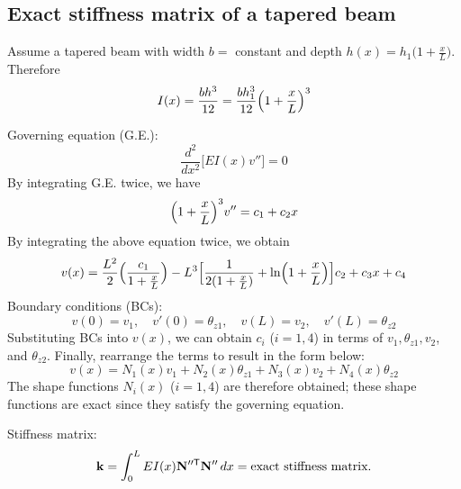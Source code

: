 \subsection{Exact stiffness matrix of a tapered beam}
\begin{minipage}{0.45\linewidth}
Assume a tapered beam with width $b =$ constant and depth $h(x) = h_1\bigl(1+\frac xL\bigr)$. Therefore
\begin{equation*}
  I(x) = \frac{bh^3}{12} = \frac{bh_1^3}{12}\Bigl(1+\frac xL\Bigr)^3
\end{equation*}
\end{minipage}\hfill
\begin{minipage}{0.5\linewidth}\centering
  
\end{minipage}

Governing equation (G.E.):
\begin{equation}
  \frac{d^2}{dx^2}\bigl[EI(x)v''\bigr] = 0
\end{equation}
By integrating G.E. twice, we have
\begin{equation}
  \Bigl(1+\frac xL\Bigr)^3v'' = c_1 + c_2x
\end{equation}
By integrating the above equation twice, we obtain
\begin{equation}
  v(x) = \frac{L^2}{2}\Bigl(\frac{c_1}{1+\frac xL}\Bigr) - L^3\Bigl[\frac{1}{2(1+\frac xL)} + \ln\Bigl(1+\frac xL\Bigr)\Bigr]c_2 + c_3x + c_4
\end{equation}
Boundary conditions (BCs):
\begin{equation*}
  v(0) = v_1,\quad v'(0) = \theta_{z1},\quad v(L) = v_2,\quad v'(L) = \theta_{z2}
\end{equation*}
Substituting BCs into $v(x)$, we can obtain $c_i$ ($i = 1, 4$) in terms of $v_1, \theta_{z1}, v_2$, and $\theta_{z2}$. Finally, rearrange the terms to result in the form below:
\begin{equation}
  v(x) = N_1(x)v_1 + N_2(x)\theta_{z1} + N_3(x)v_2 + N_4(x)\theta_{z2}
\end{equation}
The shape functions $N_i(x)$ ($i = 1, 4$) are therefore obtained; these shape functions are exact since they satisfy the governing equation.

Stiffness matrix:
\begin{equation}
  \mathbf{k} = \int_0^L EI(x)\mathbf{N}''^{\mathsf{T}}\mathbf{N}''\,dx = \text{exact stiffness matrix.}
\end{equation}

